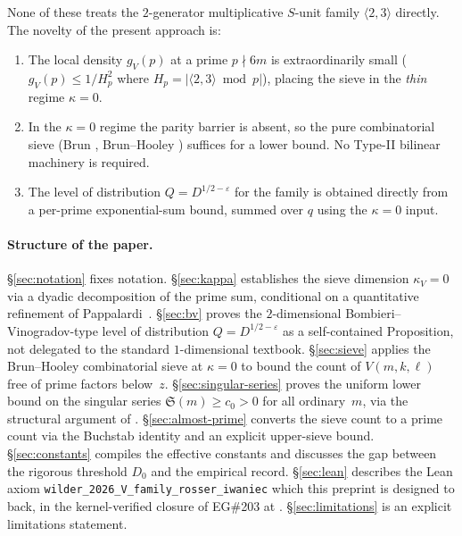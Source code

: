 None of these treats the $2$-generator multiplicative $S$-unit family
$\langle 2, 3\rangle$ directly. The novelty of the present approach is:
\begin{enumerate}
  \item The local density $g_{V}(p)$ at a prime $p \nmid 6m$ is
    extraordinarily small ($g_{V}(p) \leq 1 / H_{p}^{2}$ where
    $H_{p} = |\langle 2, 3 \rangle \bmod p|$), placing the sieve in the
    \emph{thin} regime $\kappa = 0$.
  \item In the $\kappa = 0$ regime the parity barrier is absent, so the
    pure combinatorial sieve (Brun \cite{Brun1915}, Brun--Hooley
    \cite{Hooley1971}) suffices for a lower bound. No Type-II bilinear
    machinery is required.
  \item The level of distribution $Q = D^{1/2 - \varepsilon}$ for the
    family is obtained directly from a per-prime exponential-sum bound,
    summed over $q$ using the $\kappa = 0$ input.
\end{enumerate}

\paragraph{Structure of the paper.}
\S\ref{sec:notation} fixes notation. \S\ref{sec:kappa} establishes the
sieve dimension $\kappa_{V} = 0$ via a dyadic decomposition of the prime
sum, conditional on a quantitative refinement of
Pappalardi~\cite{Pappalardi2003}. \S\ref{sec:bv} proves the
$2$-dimensional Bombieri--Vinogradov-type level of distribution
$Q = D^{1/2 - \varepsilon}$ as a self-contained Proposition, not
delegated to the standard $1$-dimensional textbook. \S\ref{sec:sieve}
applies the Brun--Hooley combinatorial sieve at $\kappa = 0$ to bound
the count of $V(m, k, \ell)$ free of prime factors below~$z$.
\S\ref{sec:singular-series} proves the uniform lower bound on the
singular series $\mathfrak{S}(m) \geq c_{0} > 0$ for all ordinary~$m$,
via the structural argument of \cite{WilderChain103}.
\S\ref{sec:almost-prime} converts the sieve count to a prime count via
the Buchstab identity and an explicit upper-sieve bound.
\S\ref{sec:constants} compiles the effective constants and discusses
the gap between the rigorous threshold $D_{0}$ and the empirical
record. \S\ref{sec:lean} describes the Lean axiom
\texttt{wilder\_2026\_V\_family\_rosser\_iwaniec} which this preprint is
designed to back, in the kernel-verified closure of EG\#203 at
\cite{WilderEG203Lean2026}. \S\ref{sec:limitations} is an explicit
limitations statement.

